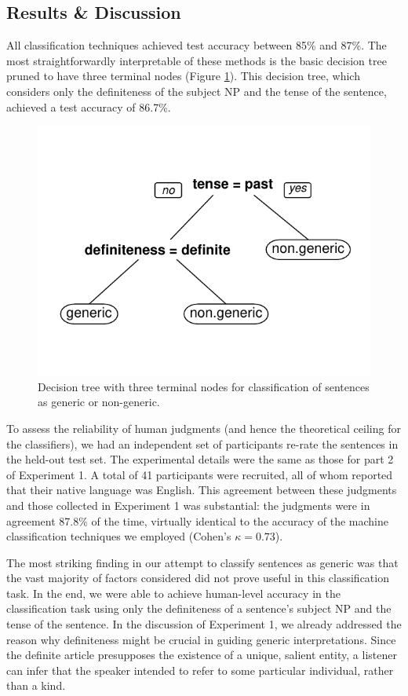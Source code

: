 \documentclass[10pt,letterpaper]{article}
\begin{document}
\subsection{Results \& Discussion}

All classification techniques achieved test accuracy between 85\% and 87\%. The most straightforwardly interpretable of these methods is the basic decision tree pruned to have three terminal nodes (Figure \ref{fig:tree}). This decision tree, which considers only the definiteness of the subject NP and the tense of the sentence, achieved a test accuracy of 86.7\%.

\begin{figure}[t]
\centering
\includegraphics[width=.8\linewidth]{figures/tree.pdf}
\caption{\label{fig:tree} Decision tree with three terminal nodes for classification of sentences as generic or non-generic.}
\end{figure}

To assess the reliability of human judgments (and hence the theoretical ceiling for the classifiers), we had an independent set of participants re-rate the sentences in the held-out test set. The experimental details were the same as those for part 2 of Experiment 1. A total of 41 participants were recruited, all of whom reported that their native language was English. This agreement between these judgments and those collected in Experiment 1 was substantial: the judgments were in agreement 87.8\% of the time, virtually identical to the accuracy of the machine classification techniques we employed (Cohen's \(\kappa = 0.73\)).

The most striking finding in our attempt to classify sentences as generic was that the vast majority of factors considered did not prove useful in this classification task. In the end, we were able to achieve human-level accuracy in the classification task using only the definiteness of a sentence's subject NP and the tense of the sentence. In the discussion of Experiment 1, we already addressed the reason why definiteness might be crucial in guiding generic interpretations. Since the definite article presupposes the existence of a unique, salient entity, a listener can infer that the speaker intended to refer to some particular individual, rather than a kind.
\end{document}
